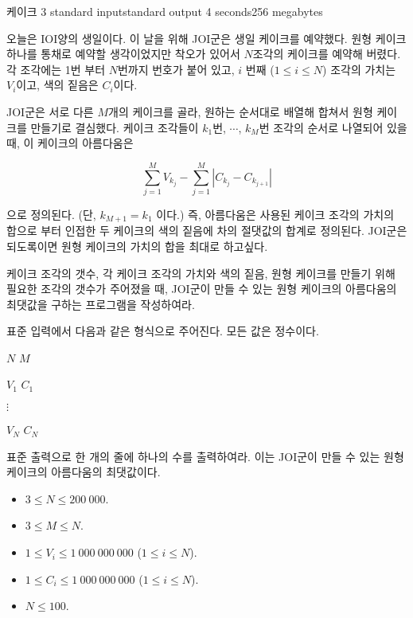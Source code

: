 \begin{problem}{케이크 3}
	{standard input}{standard output}
	{4 seconds}{256 megabytes}{}
	
	오늘은 IOI양의 생일이다. 이 날을 위해 JOI군은 생일 케이크를 예약했다. 원형 케이크 하나를 통채로 예약할 생각이었지만 착오가 있어서 $N$조각의 케이크를 예약해 버렸다. 각 조각에는 1번 부터 $N$번까지 번호가 붙어 있고, $i$ 번째 ($1 \le i \le N$) 조각의 가치는 $V_i$이고, 색의 짙음은 $C_i$이다.
	
	JOI군은 서로 다른 $M$개의 케이크를 골라, 원하는 순서대로 배열해 합쳐서 원형 케이크를 만들기로 결심했다. 케이크 조각들이 $k_1$번, $\cdots$, $k_M$번 조각의 순서로 나열되어 있을 때, 이 케이크의 아름다움은 
	
	$$
	\sum_{j=1}^{M} {V_{k_j}} - \sum_{j=1}^{M} {\left| C_{k_j} - C_{k_{j+1}}\right|}
	$$
	
	으로 정의된다. (단, $k_{M+1} = k_1$ 이다.) 즉, 아름다움은 사용된 케이크 조각의 가치의 합으로 부터 인접한 두 케이크의 색의 짙음에 차의 절댓값의 합계로 정의된다. JOI군은 되도록이면 원형 케이크의 가치의 합을 최대로 하고싶다.
	
	케이크 조각의 갯수, 각 케이크 조각의 가치와 색의 짙음, 원형 케이크를 만들기 위해 필요한 조각의 갯수가 주어졌을 때, JOI군이 만들 수 있는 원형 케이크의 아름다움의 최댓값을 구하는 프로그램을 작성하여라.
	
	\InputFile
	
	표준 입력에서 다음과 같은 형식으로 주어진다. 모든 값은 정수이다.
	
	$N$ $M$

	$V_1$ $C_1$
	
	$\vdots$
	
	$V_N$ $C_N$
	
	\OutputFile
	
	표준 출력으로 한 개의 줄에 하나의 수를 출력하여라. 이는 JOI군이 만들 수 있는 원형 케이크의 아름다움의 최댓값이다.
		
	\Constraints
	
	\begin{itemize}
		\item $3 \le N \le 200\ 000$.
		\item $3 \le M \le N$.
		\item $1 \le V_i \le 1\ 000\ 000\ 000$ ($1 \le i \le N$).
		\item $1 \le C_i \le 1\ 000\ 000\ 000$ ($1 \le i \le N$).
	\end{itemize}
	
	
	\begin{itemize}
		\item $N \le 100$.
	\end{itemize}



\end{problem}
